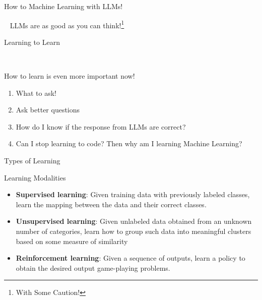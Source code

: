 \documentclass[aspectratio=169,xcolor=dvipsnames,svgnames,x11names,fleqn]{beamer}
\begin{document}
\begin{frame}
    \sectionpage
\end{frame}

\begin{frame}{How to Machine Learning with LLMs!}

\begin{center}\
\huge
\color{nuaablue}
LLMs are as good as you can think!\footnote{With Some Caution!}
\end{center}
\end{frame}

\begin{frame}{Learning to Learn}

\begin{center}\

\huge

\color{nuaablue}

How to learn is even more important now! 

\large

\begin{enumerate}



\item What to ask!
\item Ask better questions
\item How do I know if the response from LLMs are correct?
\item Can I stop learning to code? Then why am I learning Machine Learning?

\end{enumerate}

\end{center}


\end{frame}


\begin{frame}{Types of Learning}
\begin{tblock}{Learning Modalities}
    
\begin{itemize}
    \item<2-> {\bf\color{DarkBlue} Supervised learning}: Given training data with previously labeled classes, learn the mapping between the data and their correct classes. 
    \item<3-> {\bf\color{DarkBlue} Unsupervised learning}: Given unlabeled data obtained from an unknown number of categories, learn how to group such data into meaningful clusters based on some measure of similarity
    \item<4-> {\bf\color{DarkBlue} Reinforcement learning}: Given a sequence of outputs, learn a policy to obtain the desired output game-playing problems.
\end{itemize}
\end{tblock}

\end{frame}
\end{document}
